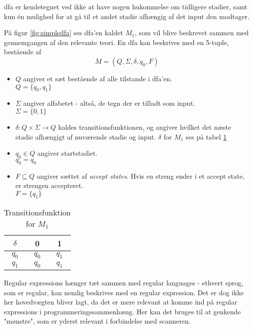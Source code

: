 \noindent \gls{dfa} er kendetegnet ved ikke at have nogen hukommelse om tidligere stadier, samt kun én mulighed for at gå til et andet stadie afhængig af det input den modtager.


\noindent På figur \ref{fig:simpledfa} ses \gls{dfa}'en kaldet $M_1$, som vil blive beskrevet sammen med gennemgangen af den relevante teori. En \gls{dfa} kan beskrives med en 5-tuple, bestående af \[M = (Q, \Sigma, \delta, q_0, F)\]

\begin{itemize}
    \item $Q$ angiver et sæt bestående af alle tilstande i \gls{dfa}'en.\\
        $Q = \{q_0, q_1\}$
    \item $\Sigma$ angiver alfabetet - altså, de tegn der er tilladt som input.\\
        $\Sigma = \{0, 1\}$
    \item $\delta: Q \times \Sigma \rightarrow Q$ kaldes transitionsfunktionen, og angiver hvilket det næste stadie afhængigt af nuværende stadie og input. $\delta$ for $M_1$ ses på tabel \ref{tab:transfunk_m1}
    \item $q_0 \in Q$ angiver startstadiet.\\
        $q_0 = q_0$
    \item $F \subseteq Q$ angiver sættet af \textit{accept states}. Hvis en streng ender i et accept state, er strengen accepteret.\\
        $F = \{q_1\}$
\end{itemize}

\begin{table}[H]
    \centering
        \begin{tabular}{ c|c c }
        \centering
            $\delta$ & 0 & 1\\ \hline 
            $q_0$ & $q_0$ & $q_1$\\
            $q_1$ & $q_0$ & $q_1$\\
        \end{tabular}
    \caption{Transitionsfunktion for $M_1$}
    \label{tab:transfunk_m1}
\end{table}

Regular expressions hænger tæt sammen med regular languages - ethvert sprog, som er regular, kan nemlig beskrives med en regular expression. Det er dog ikke her hovedvægten bliver lagt, da det er mere relevant at komme ind på regular expressions i programmeringssammenhæng. Her kan det bruges til at genkende "mønstre"\mbox{}, som er yderst relevant i forbindelse med scanneren. 

